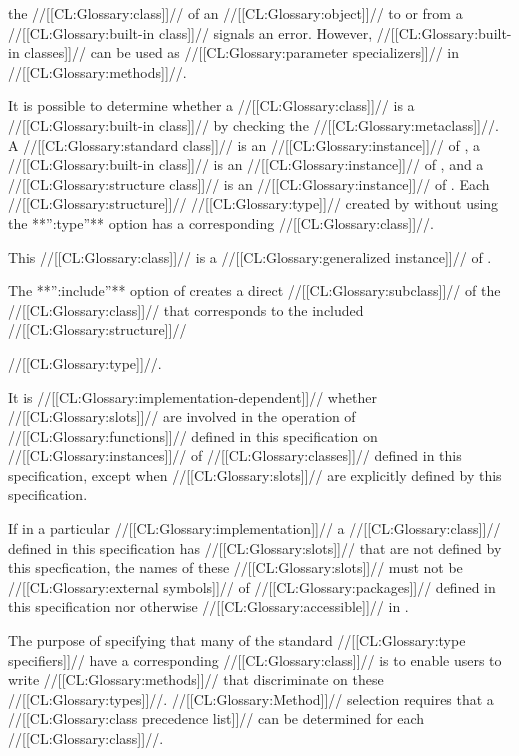 the //[[CL:Glossary:class]]// of an //[[CL:Glossary:object]]// to or from a //[[CL:Glossary:built-in class]]// signals an error. However, //[[CL:Glossary:built-in classes]]// can be used as //[[CL:Glossary:parameter specializers]]//  in //[[CL:Glossary:methods]]//.
                                        

It is possible to determine whether a //[[CL:Glossary:class]]// is a //[[CL:Glossary:built-in class]]// by checking the //[[CL:Glossary:metaclass]]//. A //[[CL:Glossary:standard class]]//  is an //[[CL:Glossary:instance]]// of , a //[[CL:Glossary:built-in class]]//  is an //[[CL:Glossary:instance]]// of , and a //[[CL:Glossary:structure class]]// is an //[[CL:Glossary:instance]]// of .
                                 Each //[[CL:Glossary:structure]]// //[[CL:Glossary:type]]// created by  without  using the **'':type''** option has a corresponding //[[CL:Glossary:class]]//.  

This //[[CL:Glossary:class]]// is a //[[CL:Glossary:generalized instance]]// of .  

The **'':include''** option of  creates a direct //[[CL:Glossary:subclass]]// of the //[[CL:Glossary:class]]//  that corresponds to the included //[[CL:Glossary:structure]]// 

//[[CL:Glossary:type]]//.

 It is //[[CL:Glossary:implementation-dependent]]// whether //[[CL:Glossary:slots]]// are involved in the operation of //[[CL:Glossary:functions]]// defined in this specification on //[[CL:Glossary:instances]]// of //[[CL:Glossary:classes]]// defined in this specification, except when //[[CL:Glossary:slots]]// are explicitly defined by this specification.

If in a particular //[[CL:Glossary:implementation]]// a //[[CL:Glossary:class]]// defined in this specification has //[[CL:Glossary:slots]]// that are not defined by this specfication, the names of these //[[CL:Glossary:slots]]// must not be //[[CL:Glossary:external symbols]]// of //[[CL:Glossary:packages]]// defined in this specification nor otherwise //[[CL:Glossary:accessible]]// in .

                                                     The purpose of specifying that many of the standard //[[CL:Glossary:type specifiers]]// have a corresponding //[[CL:Glossary:class]]// is to enable users to write //[[CL:Glossary:methods]]// that discriminate on these //[[CL:Glossary:types]]//.  //[[CL:Glossary:Method]]// selection requires that a  //[[CL:Glossary:class precedence list]]// can be determined for each //[[CL:Glossary:class]]//. 

